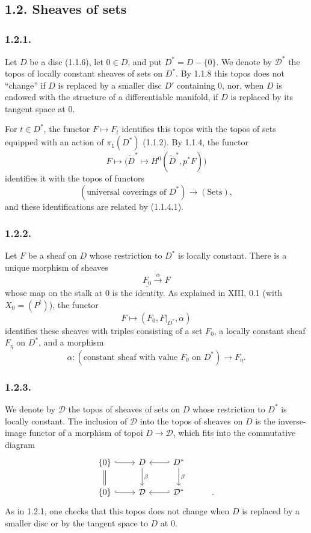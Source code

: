 \subsection*{1.2. Sheaves of sets}

\subsubsection*{1.2.1.}
Let $D$ be a disc (1.1.6), let $0\in D$, and put
$D^*=D-\{0\}$.  We denote by $\mathcal D^*$ the topos of locally
constant sheaves of sets on $D^*$.  By 1.1.8 this topos does not
``change'' if $D$ is replaced by a smaller disc $D'$ containing $0$,
nor, when $D$ is endowed with the structure of a differentiable
manifold, if $D$ is replaced by its tangent space at $0$.

For $t\in D^*$, the functor $F\longmapsto F_t$ identifies this topos
with the topos of sets equipped with an action of $\pi_1(D^*)$
(1.1.2).  By 1.1.4, the functor
\[
F\longmapsto
\bigl(\widetilde D^*\longmapsto
H^0(\widetilde D^*,p^*F)\bigr)
\]
identifies it with the topos of functors
\[
(\text{universal coverings of }D^*)
\longrightarrow(\mathrm{Sets}),
\]
and these identifications are related by (1.1.4.1).

\subsubsection*{1.2.2.}
Let $F$ be a sheaf on $D$ whose restriction to $D^*$ is locally
constant.  There is a unique morphism of sheaves
\[
\underline{F_0}\xrightarrow{\ \alpha\ }F
\]
whose map on the stalk at $0$ is the identity.  As explained in
XIII, 0.1 (with $X_0=(P^t)$), the functor
\[
F\longmapsto(F_0,F|_{D^*},\alpha)
\]
identifies these sheaves with triples consisting of a set $F_0$, a
locally constant sheaf $F_\eta$ on $D^*$, and a morphism
\[
\alpha:
(\text{constant sheaf with value }F_0\text{ on }D^*)
\longrightarrow F_\eta.
\]

\subsubsection*{1.2.3.}
We denote by $\mathcal D$ the topos of sheaves of sets on $D$ whose
restriction to $D^*$ is locally constant.  The inclusion of
$\mathcal D$ into the topos of sheaves on $D$ is the inverse-image
functor of a morphism of topoi $D\longrightarrow\mathcal D$, which
fits into the commutative diagram
\[
\begin{tikzcd}
\{0\} \arrow[r, hook] \arrow[d, equal]
  & D \arrow[d, "\beta"]
  & D^* \arrow[l, hook'] \arrow[d, "\beta"] & {} \\
\{0\} \arrow[r, hook]
  & \mathcal D
  & \mathcal D^* \arrow[l, hook'] & {}.
\end{tikzcd}
\]
As in 1.2.1, one checks that this topos does not change when $D$ is
replaced by a smaller disc or by the tangent space to $D$ at $0$.

